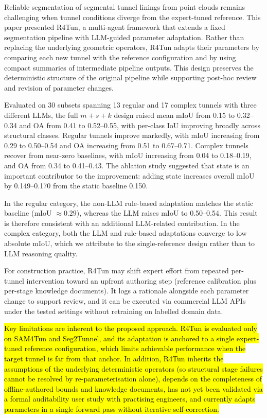 \documentclass[a4paper,fleqn]{cas-dc}
\begin{document}
{Reliable segmentation of segmental tunnel linings from point clouds remains challenging when tunnel conditions diverge from the expert-tuned reference. This paper presented R4Tun, a multi-agent framework that extends a fixed segmentation pipeline with LLM-guided parameter adaptation. Rather than replacing the underlying geometric operators, R4Tun adapts their parameters by comparing each new tunnel with the reference configuration and by using compact summaries of intermediate pipeline outputs. This design preserves the deterministic structure of the original pipeline while supporting post-hoc review and revision of parameter changes.

Evaluated on 30 subsets spanning 13 regular and 17 complex tunnels with three different LLMs, the full \mbox{$m+s+k$} design raised mean mIoU from 0.15 to 0.32--0.34 and OA from 0.41 to 0.52--0.55, with per-class IoU improving broadly across structural classes. Regular tunnels improve markedly, with mIoU increasing from 0.29 to 0.50--0.54 and OA increasing from 0.51 to 0.67--0.71. Complex tunnels recover from near-zero baselines, with mIoU increasing from 0.04 to 0.18--0.19, and OA from 0.34 to 0.41--0.43. The ablation study suggested that state is an important contributor to the improvement: adding state increases overall mIoU by 0.149--0.170 from the static baseline 0.150.

In the regular category, the non-LLM rule-based adaptation matches the static baseline (mIoU $\approx 0.29$), whereas the LLM raises mIoU to 0.50--0.54. This result is therefore consistent with an additional LLM-related contribution. In the complex category, both the LLM and rule-based adaptations converge to low absolute mIoU, which we attribute to the single-reference design rather than to LLM reasoning quality.

For construction practice, R4Tun may shift expert effort from repeated per-tunnel intervention toward an upfront authoring step (reference calibration plus per-stage knowledge documents). It logs a rationale alongside each parameter change to support review, and it can be executed via commercial LLM APIs under the tested settings without retraining on labelled domain data.

\hl{Key limitations are inherent to the proposed approach. R4Tun is evaluated only on SAM4Tun and Seg2Tunnel, and its adaptation is anchored to a single expert-tuned reference configuration, which limits achievable performance when the target tunnel is far from that anchor. In addition, R4Tun inherits the assumptions of the underlying deterministic operators (so structural stage failures cannot be resolved by re-parameterisation alone), depends on the completeness of offline-authored bounds and knowledge documents, has not yet been validated via a formal auditability user study with practising engineers, and currently adapts parameters in a single forward pass without iterative self-correction.}

}
\end{document}
